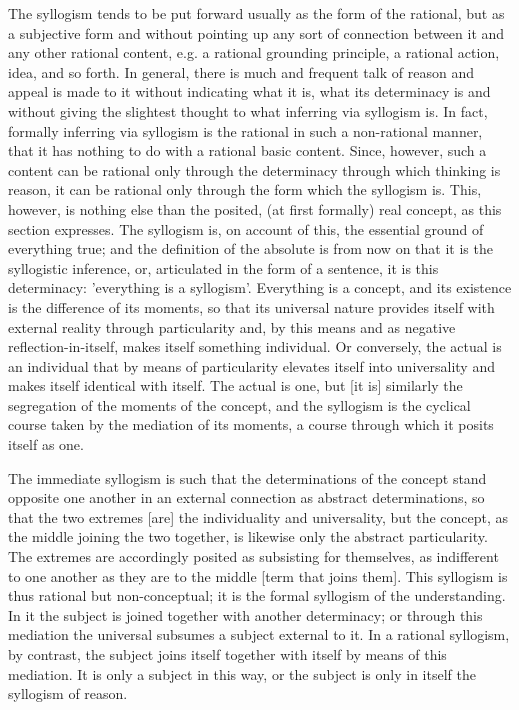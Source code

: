     The syllogism tends to be put forward usually as the form of the rational,
    but as a subjective form and without pointing up any sort
    of connection between it and any other rational content, e.g. a
    rational grounding principle, a rational action, idea, and so forth.
    In general, there is much and frequent talk of reason and appeal is
    made to it without indicating what it is, what its determinacy is and
    without giving the slightest thought to what inferring via syllogism is.
    In fact, formally inferring via syllogism is the rational in
    such a non-rational manner, that it has nothing to do
    with a rational basic content. Since, however, such a content can be
    rational only through the determinacy through which thinking is
    reason, it can be rational only through the form which the syllogism is.
    This, however, is nothing else than the posited, (at first formally) real concept,
    as this section expresses.
    The syllogism is, on account of this, the essential ground of everything true;
    and the definition of the absolute is from now on that it is the syllogistic inference,
    or, articulated in the form of a sentence, it is this determinacy:
    'everything is a syllogism'.
    Everything is a concept, and its existence is the difference of its moments,
    so that its universal nature provides itself with external reality
    through particularity and, by this means and as negative reflection-in-itself,
    makes itself something individual.
    Or conversely, the actual is an individual that by means
    of particularity elevates itself into universality and
    makes itself identical with itself.
    The actual is one, but [it is] similarly the segregation of
    the moments of the concept, and
    the syllogism is the cyclical course taken by the mediation of its moments,
    a course through which it posits itself as one.

The immediate syllogism is such that the determinations of the concept
stand opposite one another in an external connection as abstract determinations,
so that the two extremes [are] the individuality and universality,
but the concept, as the middle joining the two together,
is likewise only the abstract particularity.
The extremes are accordingly posited as subsisting for themselves,
as indifferent to one another as they are to the middle [term that joins them].
This syllogism is thus rational but non-conceptual;
it is the formal syllogism of the understanding.
In it the subject is joined together with another determinacy;
or through this mediation the universal subsumes a subject external to it.
In a rational syllogism, by contrast, the subject joins itself
together with itself by means of this mediation.
It is only a subject in this way, or the subject is only in itself
the syllogism of reason.

